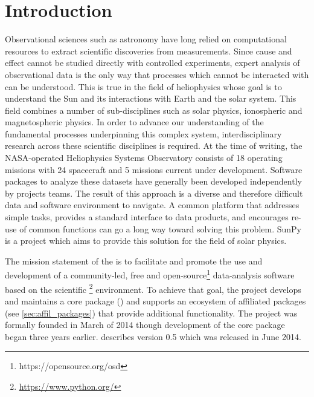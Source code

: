 \section{Introduction}
\label{sec:intro}

Observational sciences such as astronomy have long relied on computational resources to extract scientific discoveries from measurements. 
Since cause and effect cannot be studied directly with controlled experiments, expert analysis of observational data is the only way that processes which cannot be interacted with can be understood. 
This is true in the field of heliophysics whose goal is to understand the Sun and its interactions with Earth and the solar system. 
This field combines a number of sub-disciplines such as solar physics, ionospheric and magnetospheric physics. 
In order to advance our understanding of the fundamental processes underpinning this complex system, interdisciplinary research across these scientific disciplines is required. 
At the time of writing, the NASA-operated Heliophysics Systems Observatory consists of 18 operating missions with 24 spacecraft and 5 missions current under development.  
Software packages to analyze these datasets have generally been developed independently by projects teams. 
The result of this approach is a diverse and therefore difficult data and software environment to navigate. 
A common platform that addresses simple tasks, provides a standard interface to data products, and encourages re-use of common functions can go a long way toward solving this problem. 
SunPy is a project which aims to provide this solution for the field of solar physics. 

The mission statement of the \sunpyproj is to facilitate and promote the use and development of a community-led, free and open-source\footnote{https://opensource.org/osd} data-analysis software based on the scientific \python\footnote{\url{https://www.python.org/}} environment. 
To achieve that goal, the project develops and maintains a core package (\sunpypkg) and supports an ecosystem of affiliated packages (see \ref{sec:affil_packages}) that provide additional functionality. 
The project was formally founded in March of 2014 though development of the core package began three years earlier. 
\citet{Community:2015cy} describes version 0.5 which was released in June 2014.

